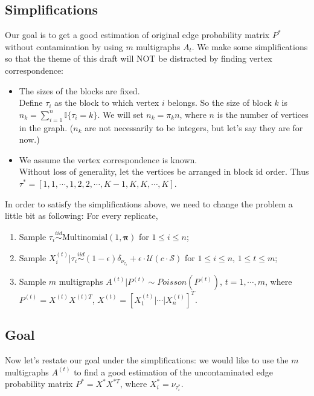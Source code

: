 \documentclass[a4paper]{article}
\begin{document}
\subsection{Simplifications}
Our goal is to get a good estimation of original edge probability matrix $P^*$ without contamination by using $m$ multigraphs $A_t$. We make some simplifications so that 
the theme of this draft will NOT be distracted by finding vertex correspondence:
\begin{itemize}
\item The sizes of the blocks are fixed. \\
Define $\tau_i$ as the block to which vertex $i$ belongs. So the size of block $k$ is $n_k = \sum_{i=1}^n \mathbb{I} \{ \tau_i = k\}$. We will set $n_k = \pi_k n$, where $n$ is the number of vertices in the graph. ($n_k$ are not necessarily to be integers, but let's say they are for now.)

\item We assume the vertex correspondence is known.\\
Without loss of generality, let the vertices be arranged in block id order. Thus $\tau^* = [1, 1, \cdots, 1, 2, 2, \cdots, K-1, K, K, \cdots, K]$.
\end{itemize}

In order to satisfy the simplifications above, we need to change the problem a little bit as following:
For every replicate, 
\begin{enumerate}
\item Sample $\tau_i \stackrel{iid}{\sim} \text{Multinomial} (1, \boldsymbol{\pi}) $ for $1 \le i \le n$;
\item Sample $X_i^{(t)} | \tau_i \stackrel{iid}{\sim} (1 - \epsilon) \delta_{\nu_{\tau_i}} + \epsilon \cdot \mathcal{U}\left( c \cdot \mathcal{S} \right)$ for $1 \le i \le n$, $1 \le t \le m$;
\item Sample $m$ multigraphs $A^{(t)} | P^{(t)} \sim Poisson(P^{(t)})$, $t = 1, \cdots, m$, where $P^{(t)} = X^{(t)} X^{(t)T}$, $X^{(t)} = [X_1^{(t)}|\cdots|X_n^{(t)}]^T$.
\end{enumerate}



\subsection{Goal}
Now let's restate our goal under the simplifications: we would like to use the $m$ multigraphs $A^{(t)}$ to find a good estimation of the uncontaminated edge probability matrix $P^* = X^* X^{*T}$, where $X^*_i = \nu_{\tau^*_i}$.
\end{document}
